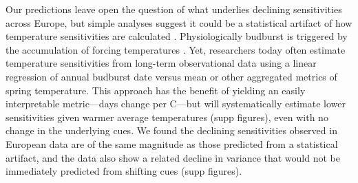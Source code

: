 \documentclass{article}
\begin{document}
\par Our predictions leave open the question of what underlies declining sensitivities across Europe, but simple analyses suggest it could be a statistical artifact of how temperature sensitivities are calculated \citep{vitasse2018,gusewell2017}. Physiologically budburst is triggered by the accumulation of forcing temperatures \citep{hanninen1995,chuine2016}. Yet, researchers today often estimate temperature sensitivities from long-term observational data using a linear regression of annual budburst date  versus mean or other aggregated metrics of spring temperature. This approach has the benefit of yielding an easily interpretable metric---days change per \degree C---but will systematically estimate lower sensitivities given warmer average temperatures (supp figures), even with no change in the underlying cues. We found the declining  sensitivities observed in European data are of the same magnitude as those predicted from a statistical artifact, and the data also show a related decline in variance that would not be immediately predicted from shifting cues (supp figures). %
\end{document}
